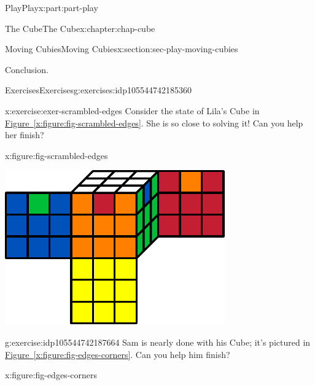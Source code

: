 \documentclass[oneside,10pt,]{book}
\newcommand{\xreffont}{\relax}
\numberwithin{equation}{section}
\begin{document}
\begin{partptx}{Play}{}{Play}{}{}{x:part:part-play}
\begin{chapterptx}{The Cube}{}{The Cube}{}{}{x:chapter:chap-cube}
\begin{sectionptx}{Moving Cubies}{}{Moving Cubies}{}{}{x:section:sec-play-moving-cubies}
\begin{conclusion}{Conclusion.}
\end{conclusion}%
%
%
\typeout{************************************************}
\typeout{************************************************}
%
\begin{exercises-subsection-numberless}{Exercises}{}{Exercises}{}{}{g:exercises:idp105544742185360}
\begin{divisionexercise}{1}{}{}{x:exercise:exer-scrambled-edges}%
Consider the state of Lila's Cube in \hyperref[x:figure:fig-scrambled-edges]{Figure~{\xreffont\ref{x:figure:fig-scrambled-edges}}}. She is so close to solving it! Can you help her finish?%
\begin{figureptx}{}{x:figure:fig-scrambled-edges}{}%
\begin{image}{0.25}{0.5}{0.25}%
\includegraphics[width=\linewidth]{./images/scrambled_edges.pdf}
\end{image}%
\tcblower
\end{figureptx}%
\end{divisionexercise}%
\begin{divisionexercise}{2}{}{}{g:exercise:idp105544742187664}%
Sam is nearly done with his Cube; it's pictured in \hyperref[x:figure:fig-edges-corners]{Figure~{\xreffont\ref{x:figure:fig-edges-corners}}}. Can you help him finish?%
\begin{figureptx}{}{x:figure:fig-edges-corners}{}%
\begin{image}{0.25}{0.5}{0.25}%

\end{image}
\end{figureptx}
\end{divisionexercise}
\end{exercises-subsection-numberless}
\end{sectionptx}
\end{chapterptx}
\end{partptx}
\end{document}
